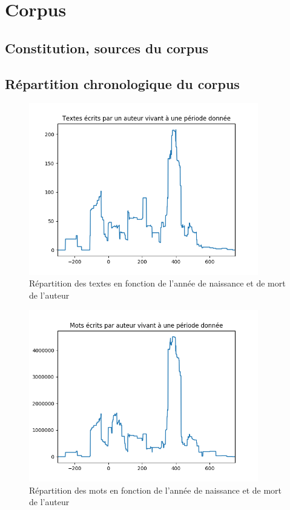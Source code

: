 \section{Corpus}
\label{sec:corpus}

\subsection{Constitution, sources du corpus}
\label{subsec:corpus_constitution}

\subsection{Répartition chronologique du corpus}
\label{subsec:corpus_chrono}

\begin{figure}[h]
    \centering
    \includegraphics[width=10cm]{../results/analysis/corpus_analysis/texts_per_year.png}
    \caption{Répartition des textes en fonction de l'année de naissance et de mort de l'auteur}
    \label{texts_per_year}
\end{figure}

\begin{figure}[h]
    \centering
    \includegraphics[width=10cm]{../results/analysis/corpus_analysis/tokens_per_year.png}
    \caption{Répartition des mots en fonction de l'année de naissance et de mort de l'auteur}
    \label{tokens_per_year}
\end{figure}

